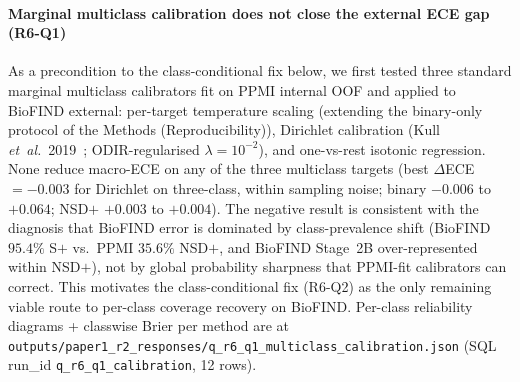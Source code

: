 \documentclass[10pt,letterpaper]{article}
\begin{document}
\paragraph*{Marginal multiclass calibration does not close the external ECE gap (R6-Q1)} As a precondition to the class-conditional fix below, we first tested three standard marginal multiclass calibrators fit on PPMI internal OOF and applied to BioFIND external: per-target temperature scaling (extending the binary-only protocol of the Methods (Reproducibility)), Dirichlet calibration (Kull \emph{et~al.}~2019~\cite{kull2019dirichlet}; ODIR-regularised $\lambda{=}10^{-2}$), and one-vs-rest isotonic regression. None reduce macro-ECE on any of the three multiclass targets (best $\Delta$ECE $= -0.003$ for Dirichlet on three-class, within sampling noise; binary $-0.006$ to $+0.064$; NSD$+$ $+0.003$ to $+0.004$). The negative result is consistent with the diagnosis that BioFIND error is dominated by class-prevalence shift (BioFIND $95.4\%$ S$+$ vs.\ PPMI $35.6\%$ NSD$+$, and BioFIND Stage~2B over-represented within NSD$+$), not by global probability sharpness that PPMI-fit calibrators can correct. This motivates the class-conditional fix (R6-Q2) as the only remaining viable route to per-class coverage recovery on BioFIND. Per-class reliability diagrams + classwise Brier per method are at \texttt{outputs/paper1\_r2\_responses/q\_r6\_q1\_multiclass\_calibration.json} (SQL run\_id \texttt{q\_r6\_q1\_calibration}, 12 rows).
\end{document}
